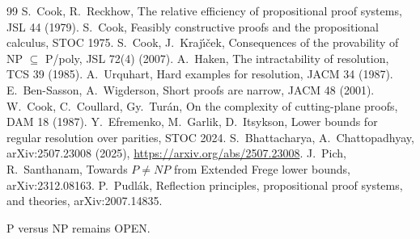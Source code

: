 \documentclass[11pt]{article}
\theoremstyle{definition}
\begin{document}
\begin{thebibliography}{99}
 S.~Cook, R.~Reckhow, The relative efficiency of propositional proof systems, JSL 44 (1979).
 S.~Cook, Feasibly constructive proofs and the propositional calculus, STOC 1975.
 S.~Cook, J.~Kraj\'\i\v{c}ek, Consequences of the provability of NP $\subseteq$ P/poly, JSL 72(4) (2007).
 A.~Haken, The intractability of resolution, TCS 39 (1985).
 A.~Urquhart, Hard examples for resolution, JACM 34 (1987).
 E.~Ben-Sasson, A.~Wigderson, Short proofs are narrow, JACM 48 (2001).
 W.~Cook, C.~Coullard, Gy.~Tur\'an, On the complexity of cutting-plane proofs, DAM 18 (1987).
 Y.~Efremenko, M.~Garlik, D.~Itsykson, Lower bounds for regular resolution over parities, STOC 2024.
 S.~Bhattacharya, A.~Chattopadhyay, arXiv:2507.23008 (2025), \url{https://arxiv.org/abs/2507.23008}.
 J.~Pich, R.~Santhanam, Towards $P\ne NP$ from Extended Frege lower bounds, arXiv:2312.08163.
 P.~Pudl\'ak, Reflection principles, propositional proof systems, and theories, arXiv:2007.14835.
\end{thebibliography}

\noindent P versus NP remains OPEN.
\end{document}
